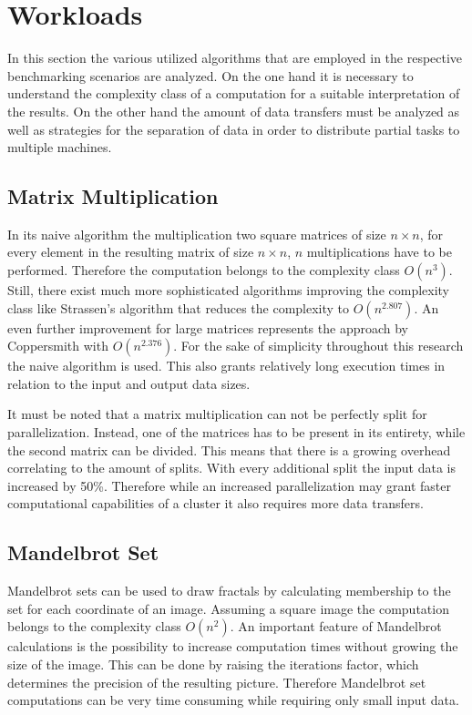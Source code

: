 \section{Workloads}
\label{workload_explanation}
In this section the various utilized algorithms that are employed in the respective benchmarking scenarios are analyzed. On the one hand it is necessary to understand the complexity class of a computation for a suitable interpretation of the results. On the other hand the amount of data transfers must be analyzed as well as strategies for the separation of data in order to distribute partial tasks to multiple machines.

\subsection*{Matrix Multiplication}
\label{matrix_multiplication_workload}
In its naive algorithm the multiplication two square matrices of size $n\times n$, for every element in the resulting matrix of size $n\times n$, $n$ multiplications have to be performed. Therefore the computation belongs to the complexity class $O(n^3)$. Still, there exist much more sophisticated algorithms improving the complexity class like Strassen's algorithm that reduces the complexity to $O(n^{2.807})$\cite{strassen}. An even further improvement for large matrices represents the approach by Coppersmith with $O(n^{2.376})$\cite{coppersmith}. For the sake of simplicity throughout this research the naive algorithm is used. This also grants relatively long execution times in relation to the input and output data sizes.

It must be noted that a matrix multiplication can not be perfectly split for parallelization. Instead, one of the matrices has to be present in its entirety, while the second matrix can be divided. This means that there is a growing overhead correlating to the amount of splits. With every additional split the input data is increased by 50\%. Therefore while an increased parallelization may grant faster computational capabilities of a cluster it also requires more data transfers.

\subsection*{Mandelbrot Set}

Mandelbrot sets can be used to draw fractals by calculating membership to the set for each coordinate of an image. Assuming a square image the computation belongs to the complexity class $O(n^2)$. An important feature of Mandelbrot calculations is the possibility to increase computation times without growing the size of the image. This can be done by raising the iterations factor, which determines the precision of the resulting picture. Therefore Mandelbrot set computations can be very time consuming while requiring only small input data.

